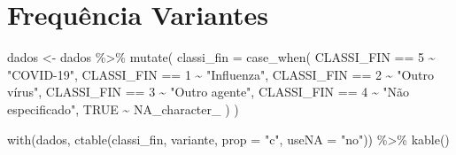 \documentclass[
]{article}
\newenvironment{Shaded}{\begin{snugshade}}{\end{snugshade}}
\newcommand{\AttributeTok}[1]{\textcolor[rgb]{0.77,0.63,0.00}{#1}}
\newcommand{\ConstantTok}[1]{\textcolor[rgb]{0.00,0.00,0.00}{#1}}
\newcommand{\DecValTok}[1]{\textcolor[rgb]{0.00,0.00,0.81}{#1}}
\newcommand{\FunctionTok}[1]{\textcolor[rgb]{0.00,0.00,0.00}{#1}}
\newcommand{\NormalTok}[1]{#1}
\newcommand{\OtherTok}[1]{\textcolor[rgb]{0.56,0.35,0.01}{#1}}
\newcommand{\SpecialCharTok}[1]{\textcolor[rgb]{0.00,0.00,0.00}{#1}}
\newcommand{\StringTok}[1]{\textcolor[rgb]{0.31,0.60,0.02}{#1}}
\begin{document}
\hypertarget{frequuxeancia-variantes}{%
\section{Frequência Variantes}\label{frequuxeancia-variantes}}

\begin{Shaded}
\begin{Highlighting}[]
\NormalTok{dados }\OtherTok{\textless{}{-}}
\NormalTok{  dados }\SpecialCharTok{\%\textgreater{}\%} \FunctionTok{mutate}\NormalTok{(}
    \AttributeTok{classi\_fin =} \FunctionTok{case\_when}\NormalTok{(}
\NormalTok{      CLASSI\_FIN }\SpecialCharTok{==} \DecValTok{5} \SpecialCharTok{\textasciitilde{}} \StringTok{"COVID{-}19"}\NormalTok{,}
\NormalTok{      CLASSI\_FIN }\SpecialCharTok{==} \DecValTok{1} \SpecialCharTok{\textasciitilde{}} \StringTok{"Influenza"}\NormalTok{,}
\NormalTok{      CLASSI\_FIN }\SpecialCharTok{==} \DecValTok{2} \SpecialCharTok{\textasciitilde{}} \StringTok{"Outro vírus"}\NormalTok{,}
\NormalTok{      CLASSI\_FIN }\SpecialCharTok{==} \DecValTok{3} \SpecialCharTok{\textasciitilde{}} \StringTok{"Outro agente"}\NormalTok{,}
\NormalTok{      CLASSI\_FIN }\SpecialCharTok{==} \DecValTok{4} \SpecialCharTok{\textasciitilde{}} \StringTok{"Não especificado"}\NormalTok{,}
      \ConstantTok{TRUE} \SpecialCharTok{\textasciitilde{}} \ConstantTok{NA\_character\_}
\NormalTok{    )}
\NormalTok{  )}

\FunctionTok{with}\NormalTok{(dados, }\FunctionTok{ctable}\NormalTok{(classi\_fin, variante, }\AttributeTok{prop =} \StringTok{"c"}\NormalTok{, }\AttributeTok{useNA =} \StringTok{"no"}\NormalTok{)) }\SpecialCharTok{\%\textgreater{}\%} \FunctionTok{kable}\NormalTok{()}
\end{Highlighting}
\end{Shaded}
\end{document}
